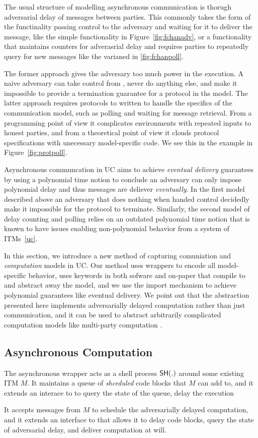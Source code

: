 The usual structure of modelling asynchronous communication is thorugh adversarial
delay of messages between parties. This commonly takes the form of the functinality
passing control to the adversary and waiting for it to deliver the message, like the
simple \Fchan functionality in Figure~\ref{fig:fchanadv}, or a functionality that 
maintains counters for adverasrial delay and requires parties to repeatedly query for
new messages like the \Fchan varianed in \ref{fig:fchanpoll}. 

The former approach gives the adversary too much power in the execution. A naive adversary
can take control from \Fchan, never do anything else, and make it impossible to provide
a termination guarantee for a protocol in ths model. The latter approach requires protocols
to written to handle the specifics of the communication model, such as polling and waiting
for message retrieval. From a programming point of view it complicates environments
with repeated inputs to honest parties, and from a theoretical point of view it clouds 
protocol specifications with unecessary model-specific code. We see this in the example in
Figure~\ref{fig:protpoll}. 

Asynchronous communcation in UC aims to achieve \emph{eventual delivery} guarantees by 
using a polynomial time notion to conclude an adversary can only impose polynomial delay and 
thus messages are deliever \emph{eventually}. In the first model described above an adversary
that does nothing when handed control decidedly make it impossible for the protocol to
terminate. Similarly, the second model of delay counting and polling relies on an outdated
polynomial time notion that is known to have issues enabling non-polynomial behavior 
from a system of ITMs~\ref{uc}. 

In this section, we introduce a new method of capturing comuniation and \emph{computation} 
models in UC. Our method uses wrappers to encode all model-specific behavior, uses keywords
in both sofware and on-paper that compile to and abstract away the model, and we use
the import mechanism to achieve polynomial guarantees like eventual delivery. We point 
out that the abstraction presented here implements adversarially delayed computation
rather than just communication, and it can be used to abstract arbitrarily complicated
computation models like multi-party computation . 

\subsection{Asynchronous Computation}
The asynchronous wrapper acts as a shell process ${\mathsf {SH}}(.)$ around some existing ITM $M$. 
It maintains a queue of \emph{shceduled} code blocks that $M$ can add to, and it extends an 
interace to \A to query the state of the queue, delay the execution 


It accepts messages from $M$ to schedule the adversarially delayed computation, and it extends
an interface to \A that allows it to delay code blocks, query the state of adversarial delay,
and deliver computation at will. 

